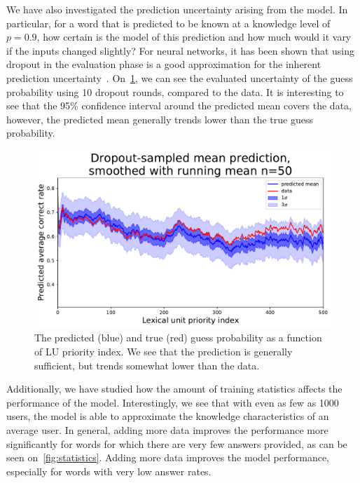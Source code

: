 We have also investigated the prediction uncertainty arising from the model. In particular, for a word that is predicted to be known at a knowledge level of $p=0.9$, how certain is the model of this prediction and how much would it vary if the inputs changed slightly? For neural networks, it has been shown that using dropout in the evaluation phase is a good approximation for the inherent prediction uncertainty~\cite{gal2016dropout}. On~\cref{fig:uncertainty}, we can see the evaluated uncertainty of the guess probability using 10 dropout rounds, compared to the data. It is interesting to see that the 95\% confidence interval around the predicted mean covers the data, however, the predicted mean generally trends lower than the true guess probability.

\begin{figure}[ht]
\centering
\includegraphics[width=1.0\linewidth]{figures/lingvist/uncertainty.pdf}
\caption{The predicted (blue) and true (red) guess probability as a function of LU priority index. We see that the prediction is generally sufficient, but trends somewhat lower than the data.}
\label{fig:uncertainty}
\end{figure}

Additionally, we have studied how the amount of training statistics affects the performance of the model. Interestingly, we see that with even as few as 1000 users, the model is able to approximate the knowledge characteristics of an average user. In general, adding more data improves the performance more significantly for words for which there are very few answers provided, as can be seen on~\cref{fig:statistics}. Adding more data improves the model performance, especially for words with very low answer rates.

